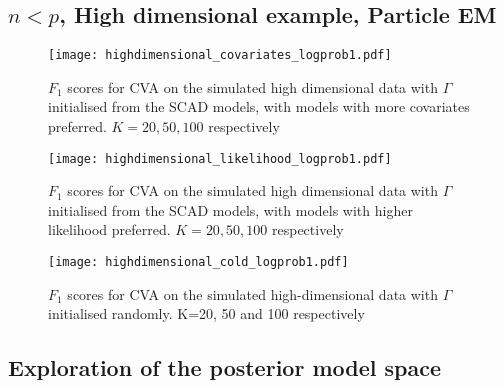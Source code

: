 \subsection{$n < p$, High dimensional example, Particle EM}

\begin{figure}
\texttt{[image: highdimensional\_covariates\_logprob1.pdf]}
\label{fig:highdim_warm_start_covariates}
\caption{$F_1$ scores for CVA on the simulated high dimensional data with $\Gamma$ initialised from the SCAD models, with models with more covariates preferred. $K=20, 50, 100$ respectively}
\end{figure}

\begin{figure}
\texttt{[image: highdimensional\_likelihood\_logprob1.pdf]}
\label{fig:highdim_warm_start_likelihood}
\caption{$F_1$ scores for CVA on the simulated high dimensional data with $\Gamma$ initialised from the SCAD models, with models with higher likelihood preferred. $K=20, 50, 100$ respectively}
\end{figure}

\begin{figure}
\texttt{[image: highdimensional\_cold\_logprob1.pdf]}
\label{fig:highdim_cold_start}
\caption{$F_1$ scores for CVA on the simulated high-dimensional data with $\Gamma$ initialised randomly.
					K=20, 50 and 100 respectively}
\end{figure}

\subsection{Exploration of the posterior model space}

